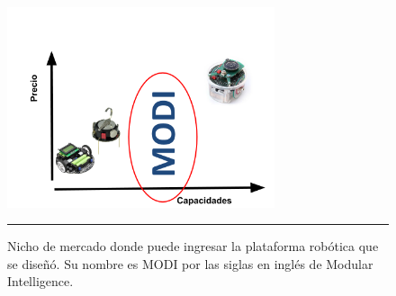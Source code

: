 \begin{figure}[htbp]
	\centering
		\includegraphics[width=0.7\textwidth]{./Figures/nicho.png}
		\rule{35em}{0.5pt}
	\caption[Nicho de mercado]{Nicho de mercado donde puede ingresar la plataforma robótica que se diseñó. Su nombre es MODI por las siglas en inglés de Modular Intelligence.}
	\label{fig:nicho}
\end{figure}



